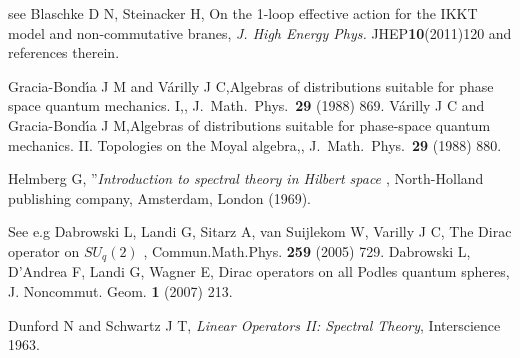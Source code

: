 \documentclass[a4paper,11pt,twoside]{article}
\numberwithin{equation}{section}
\theoremstyle{nonumberplain}
\begin{document}
\begin{thebibliography}{50}
 see Blaschke D N, Steinacker H, {{On the 1-loop effective action for the IKKT model and non-commutative branes}}, {\it{J. High Energy Phys.}} JHEP{\bf{10}}(2011)120 and references therein.

  Gracia-Bond{\'\i}a J M and V{\'a}rilly J C,{{Algebras of distributions suitable for phase space
  quantum mechanics. {I},}}, J.\ Math.\ Phys.\ {\bf 29} (1988) 869. V{\'a}rilly J C and Gracia-Bond{\'\i}a J M,{{Algebras of distributions suitable for phase-space
quantum mechanics. {II}.
  Topologies on the Moyal algebra,}}, J.\ Math.\ Phys.\  {\bf 29} (1988) 880.

 Helmberg G, ''{\it{Introduction to spectral theory in Hilbert space }}, North-Holland publishing company, Amsterdam, London (1969).

 See e.g
Dabrowski L, Landi G, Sitarz A, van Suijlekom W, Varilly J C, {{The Dirac operator on $SU_q(2)$ }}, Commun.Math.Phys. {\bf{259}} (2005) 729. Dabrowski L, D'Andrea F, Landi G, Wagner E, {{ Dirac operators on all Podles quantum spheres}}, J. Noncommut. Geom. {\bf{1}} (2007) 213.

 Dunford N and Schwartz J T, {\it{Linear Operators II: Spectral Theory}}, Interscience 1963.

\end{thebibliography}

\end{document}
